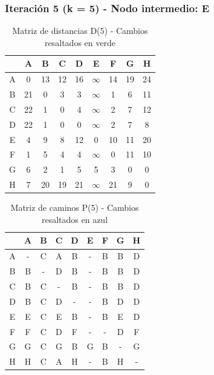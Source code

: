 \documentclass[12pt]{article}
\begin{document}
\clearpage
\subsubsection{Iteración 5 (k = 5) - Nodo intermedio: E}
\begin{table}[h!]
\centering
\begin{tabular}{|c|c|c|c|c|c|c|c|c|}
\hline
 & A & B & C & D & E & F & G & H \\\hline
A & 0 & 13 & 12 & 16 & $\infty$ & 14 & 19 & 24 \\\hline
B & 21 & 0 & 3 & 3 & $\infty$ & 1 & 6 & 11 \\\hline
C & 22 & 1 & 0 & 4 & $\infty$ & 2 & 7 & 12 \\\hline
D & 22 & 1 & 0 & 0 & $\infty$ & 2 & 7 & 8 \\\hline
E & 4 & 9 & 8 & 12 & 0 & 10 & 11 & 20 \\\hline
F & 1 & 5 & 4 & 4 & $\infty$ & 0 & 11 & 10 \\\hline
G & 6 & 2 & 1 & 5 & 5 & 3 & 0 & 0 \\\hline
H & 7 & 20 & 19 & 21 & $\infty$ & 21 & 9 & 0 \\\hline
\end{tabular}
\caption{Matriz de distancias D(5) - Cambios resaltados en verde}
\end{table}

\begin{table}[h!]
\centering
\begin{tabular}{|c|c|c|c|c|c|c|c|c|}
\hline
 & A & B & C & D & E & F & G & H \\\hline
A & - & C & A & B & - & B & B & D \\\hline
B & B & - & D & B & - & B & B & D \\\hline
C & B & C & - & B & - & B & B & D \\\hline
D & B & C & D & - & - & B & D & D \\\hline
E & E & C & E & B & - & B & E & D \\\hline
F & F & C & D & F & - & - & D & F \\\hline
G & G & C & G & B & G & B & - & G \\\hline
H & H & C & A & H & - & B & H & - \\\hline
\end{tabular}
\caption{Matriz de caminos P(5) - Cambios resaltados en azul}
\end{table}

\clearpage
\end{document}
